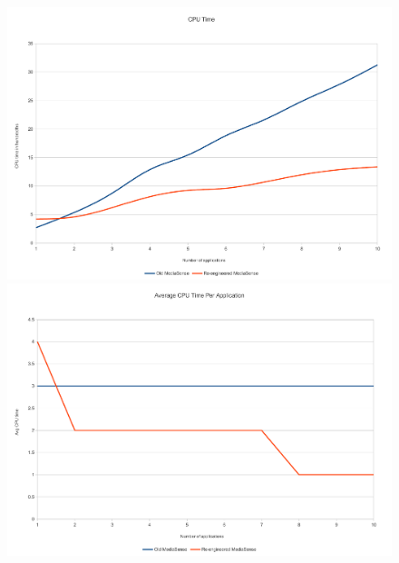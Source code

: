 \begin{figure}[H]
		\centering
    	\includegraphics[scale=0.50]{part_7/test_results/cputime.pdf}
    	\includegraphics[scale=0.50]{part_7/test_results/avg_cputime.pdf}
\end{figure}



